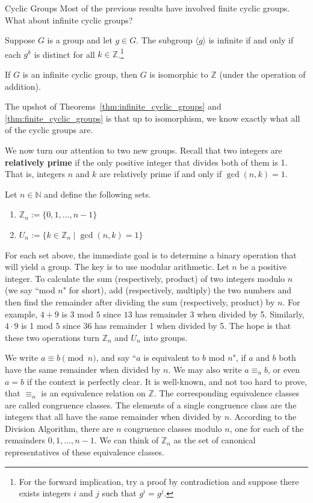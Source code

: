 \begin{section}{Cyclic Groups}
Most of the previous results have involved finite cyclic groups.  What about infinite cyclic groups?

\begin{theorem}
Suppose $G$ is a group and let $g\in G$. The subgroup $\langle g\rangle$ is infinite if and only if each $g^k$ is distinct for all $k\in\mathbb{Z}$.\footnote{For the forward implication, try a proof by contradiction and suppose there exists integers $i$ and $j$ such that $g^i=g^j$.}
\end{theorem}

\begin{theorem}\label{thm:infinite_cyclic_groups}
If $G$ is an infinite cyclic group, then $G$ is isomorphic to $\mathbb{Z}$ (under the operation of addition).
\end{theorem}

The upshot of Theorems~\ref{thm:infinite_cyclic_groups} and \ref{thm:finite_cyclic_groups} is that up to isomorphism, we know exactly what all of the cyclic groups are.

We now turn our attention to two new groups. Recall that two integers are \textbf{relatively prime} if the only positive integer that divides both of them is 1.  That is, integers $n$ and $k$ are relatively prime if and only if $\gcd(n,k)=1$.

\begin{definition}
Let $n\in\mathbb{N}$ and define the following sets.
\begin{enumerate}[label=\rm{(\alph*)}]
\item $\mathbb{Z}_n:=\{0,1,\ldots,n-1\}$
\item $U_n:=\{k\in\mathbb{Z}_n\mid \gcd(n,k)=1\}$
\end{enumerate}
\end{definition}

For each set above, the immediate goal is to determine a binary operation that will yield a group.  The key is to use modular arithmetic.  Let $n$ be a positive integer. To calculate the sum (respectively, product) of two integers modulo $n$ (we say ``mod $n$" for short), add (respectively, multiply) the two numbers and then find the remainder after dividing the sum (respectively, product) by $n$. For example, $4+9$ is $3$ mod $5$ since $13$ has remainder 3 when divided by 5.  Similarly, $4\cdot 9$ is 1 mod $5$ since 36 has remainder 1 when divided by 5. The hope is that these two operations turn $\mathbb{Z}_n$ and $U_n$ into groups.

We write $a\equiv b\pmod n$, and say ``$a$ is equivalent to $b$ mod $n$", if $a$ and $b$ both have the same remainder when divided by $n$.  We may also write $a\equiv_n b$, or even $a=b$ if the context is perfectly clear.  It is well-known, and not too hard to prove, that $\equiv_n$ is an equivalence relation on $\mathbb{Z}$.  The corresponding equivalence classes are called congruence classes.  The elements of a single congruence class are the integers that all have the same remainder when divided by $n$. According to the Division Algorithm, there are $n$ congruence classes modulo $n$, one for each of the remainders $0,1,\ldots, n-1$. We can think of $\mathbb{Z}_n$ as the set of canonical representatives of these equivalence classes.


\end{section}
